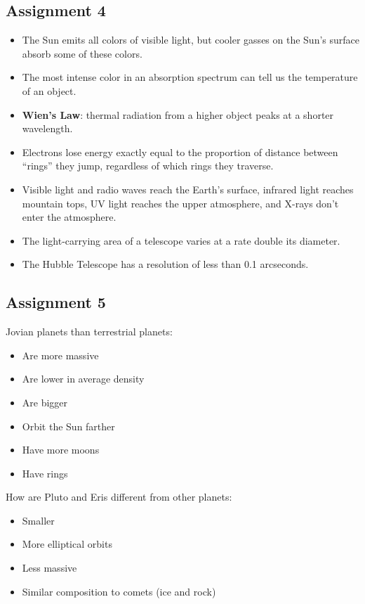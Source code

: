 \documentclass[12pt]{article}
\begin{document}
\subsection{Assignment 4}
\begin{itemize}
\item The Sun emits all colors of visible light, but cooler gasses on the Sun's surface absorb some of these colors.
\item The most intense color in an absorption spectrum can tell us the temperature of an object.
\item {\bf Wien's Law}: thermal radiation from a higher object peaks at a shorter wavelength.
\item Electrons lose energy exactly equal to the proportion of distance between ``rings'' they jump, regardless of which rings they traverse.
\item Visible light and radio waves reach the Earth's surface, infrared light reaches mountain tops, UV light reaches the upper atmosphere, and X-rays don't enter the atmosphere.
\item The light-carrying area of a telescope varies at a rate double its diameter.
\item The Hubble Telescope has a resolution of less than 0.1 arcseconds.
\end{itemize}

\subsection{Assignment 5}
Jovian planets \underline{\hspace{5em}} than terrestrial planets:
\begin{itemize}
\item Are more massive
\item Are lower in average density
\item Are bigger
\item Orbit the Sun farther
\item Have more moons
\item Have rings
\end{itemize}

How are Pluto and Eris different from other planets:
\begin{itemize}
\item Smaller
\item More elliptical orbits
\item Less massive
\item Similar composition to comets (ice and rock)
\end{itemize}
\end{document}
